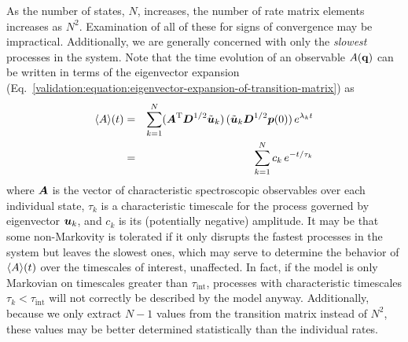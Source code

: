 
As the number of states, $N$, increases, the number of rate matrix elements increases as $N^2$.
Examination of all of these for signs of convergence may be impractical.
Additionally, we are generally concerned with only the \emph{slowest} processes in the system.
Note that the time evolution of an observable $A({\bf q})$ can be written in terms of the eigenvector expansion (Eq.\ \ref{validation:equation:eigenvector-expansion-of-transition-matrix}) as
\begin{eqnarray}
\langle A \rangle(t) &=& \sum_{k=1}^N ({\mbox{\boldmath{$A$}}}^{\mathrm{T}} {\mbox{\boldmath{$D$}}}^{1/2} \tilde{{\mbox{\boldmath{$u$}}}}_k) \, (\tilde{{\mbox{\boldmath{$u$}}}}_k {\mbox{\boldmath{$D$}}}^{1/2} {\mbox{\boldmath{$p$}}}(0)) \, e^{\lambda_k t} \nonumber \\
&=& \sum_{k=1}^N c_k \, e^{-t / \tau_k}
\end{eqnarray}
where ${\mbox{\boldmath{$A$}}}$ is the vector of characteristic spectroscopic observables over each individual state, $\tau_k$ is a characteristic timescale for the process governed by eigenvector ${\mbox{\boldmath{$u$}}}_k$, and $c_k$ is its (potentially negative) amplitude.
It may be that some non-Markovity is tolerated if it only disrupts the fastest processes in the system but leaves the slowest ones, which may serve to determine the behavior of $\langle A \rangle(t)$ over the timescales of interest, unaffected.
In fact, if the model is only Markovian on timescales greater than $\tau_\mathrm{int}$, processes with characteristic timescales $\tau_k < \tau_\mathrm{int}$ will not correctly be described by the model anyway.
Additionally, because we only extract $N-1$ values from the transition matrix instead of $N^2$, these values may be better determined statistically than the individual rates.

